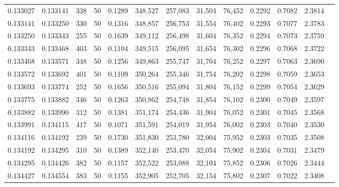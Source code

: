 \begin{tabular}{rrrrrrrrrrrrr}
0.133027 & 0.133141 &   338 &  50 &                                     0.1289 & 348,527 & 257,083 &  31,504 &  76,452 & 0.2292 & 0.7082 & 2.3814 \\
0.133141 & 0.133250 &   330 &  50 &                                     0.1316 & 348,857 & 256,753 &  31,554 &  76,402 & 0.2293 & 0.7077 & 2.3783 \\
0.133250 & 0.133343 &   255 &  50 &                                     0.1639 & 349,112 & 256,498 &  31,604 &  76,352 & 0.2294 & 0.7073 & 2.3759 \\
0.133343 & 0.133468 &   403 &  50 &                                     0.1104 & 349,515 & 256,095 &  31,654 &  76,302 & 0.2296 & 0.7068 & 2.3722 \\
0.133468 & 0.133571 &   348 &  50 &                                     0.1256 & 349,863 & 255,747 &  31,704 &  76,252 & 0.2297 & 0.7063 & 2.3690 \\
0.133572 & 0.133692 &   401 &  50 &                                     0.1109 & 350,264 & 255,346 &  31,754 &  76,202 & 0.2298 & 0.7059 & 2.3653 \\
0.133693 & 0.133774 &   252 &  50 &                                     0.1656 & 350,516 & 255,094 &  31,804 &  76,152 & 0.2299 & 0.7054 & 2.3629 \\
0.133775 & 0.133882 &   346 &  50 &                                     0.1263 & 350,862 & 254,748 &  31,854 &  76,102 & 0.2300 & 0.7049 & 2.3597 \\
0.133882 & 0.133990 &   312 &  50 &                                     0.1381 & 351,174 & 254,436 &  31,904 &  76,052 & 0.2301 & 0.7045 & 2.3568 \\
0.133991 & 0.134115 &   417 &  50 &                                     0.1071 & 351,591 & 254,019 &  31,954 &  76,002 & 0.2303 & 0.7040 & 2.3530 \\
0.134116 & 0.134192 &   239 &  50 &                                     0.1730 & 351,830 & 253,780 &  32,004 &  75,952 & 0.2303 & 0.7035 & 2.3508 \\
0.134192 & 0.134295 &   310 &  50 &                                     0.1389 & 352,140 & 253,470 &  32,054 &  75,902 & 0.2304 & 0.7031 & 2.3479 \\
0.134295 & 0.134426 &   382 &  50 &                                     0.1157 & 352,522 & 253,088 &  32,104 &  75,852 & 0.2306 & 0.7026 & 2.3444 \\
0.134427 & 0.134554 &   383 &  50 &                                     0.1155 & 352,905 & 252,705 &  32,154 &  75,802 & 0.2307 & 0.7022 & 2.3408 \\

\end{tabular}
